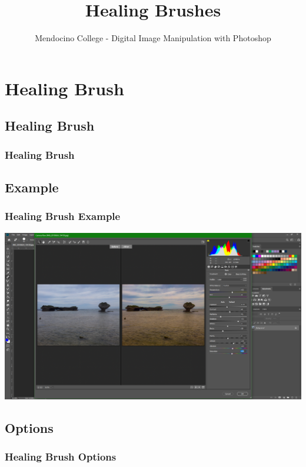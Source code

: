 \documentclass{beamer}
\title{Healing Brushes}
\author{Mendocino College - Digital Image Manipulation with Photoshop}
\date{\vspace{-5em}}
\begin{document}
	{
		\begin{frame}
			\vspace{-35pt}
			\maketitle
		\end{frame}
	}
		
		
\section{Healing Brush}

\subsection{Healing Brush}		

	\begin{frame}
		\frametitle{Healing Brush}
		\begin{outline}
			\1 
		\end{outline}
	\end{frame}

\subsection{Example}		
	\begin{frame}
		\frametitle{Healing Brush Example}
		\begin{center}
			\includegraphics[width=1.10\textwidth]{images/Camera raw filter example.png}
		\end{center}
	\end{frame}

\subsection{Options}		
	\begin{frame}
		\frametitle{Healing Brush Options}
		\begin{outline}
			\1 
		\end{outline}
	\end{frame}
\end{document}
